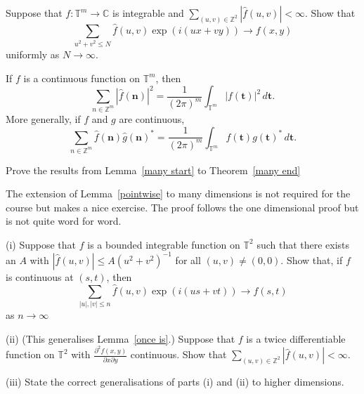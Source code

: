 \begin{exercise}\label{trivial circular}
Suppose that
$f:{\mathbb T}^{m}\rightarrow{\mathbb C}$
is integrable and
$\sum_{(u,v)\in{\mathbb Z}^{2}}|\hat{f}(u,v)|<\infty$.
Show that
\[\sum_{u^{2}+v^{2}\leq N}\hat{f}(u,v)\exp(i(ux+vy))
\rightarrow f(x,y)\]
uniformly as $N\rightarrow\infty$.
\end{exercise}
\begin{theorem} \label{many end}
If $f$ is
a continuous function on ${\mathbb T}^{m}$, then
\[\sum_{n\in{\mathbb Z}^{m}}|\hat{f}({\mathbf n})|^{2}
=\frac{1}{(2\pi)^{m}}\int_{{\mathbb T}^{m}}
|f({\mathbf t})|^{2}\,d{\mathbf t}.\]
More generally, if $f$ and $g$ are continuous,
\[\sum_{n\in{\mathbb Z}^{m}}
\hat{f}({\mathbf n})\hat{g}({\mathbf n})^{*}
=\frac{1}{(2\pi)^{m}}\int_{{\mathbb T}^{m}}
f({\mathbf t})g({\mathbf t})^{*}\,d{\mathbf t}.\]
\end{theorem}
\begin{exercise}  Prove the results from Lemma~\ref{many start}
to Theorem~\ref{many end}
\end{exercise}
\begin{exercise} The extension of Lemma~\ref{pointwise}
to many dimensions is not required for the course
but makes a nice exercise. The proof follows the
one dimensional proof but is not quite word for word.

(i) Suppose that $f$ is a  bounded
integrable function on ${\mathbb T}^{2}$ such that there
exists an $A$ with $|\hat{f}(u,v)|\leq A(u^{2}+v^{2})^{-1}$ for
all $(u,v)\neq (0,0)$. Show that,
if $f$ is continuous at $(s,t)$, then
\[\sum_{|u|,|v|\leq n}\hat{f}(u,v)\exp(i(us+vt))
\rightarrow f(s,t)\]
as $n\rightarrow\infty$

(ii) (This generalises Lemma~\ref{once is}.)
Suppose that $f$ is a
twice differentiable function on ${\mathbb T}^{2}$
with
${\displaystyle \frac{\partial^{2}f(x,y)}{\partial x\partial y}}$
continuous. Show that
$\sum_{(u,v)\in{\mathbb Z}^{2}}|\hat{f}(u,v)|<\infty$.

(iii) State the correct generalisations of parts (i) and
(ii) to higher dimensions.
\end{exercise}

